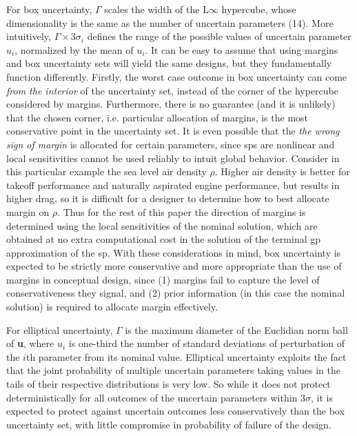 For box uncertainty,
$\Gamma$ scales the width of the L$\infty$ hypercube, whose dimensionality is the same as the number of uncertain parameters (14).
More intuitively, $\Gamma \times 3\sigma_i$ defines the range of the possible values of uncertain parameter $u_i$,
normalized by the mean of $u_i$.
It can be easy to assume that using margins and box uncertainty sets will yield the same designs,
but they fundamentally function differently.
Firstly, the worst case outcome in box uncertainty can come \emph{from the interior} of the uncertainty
set, instead of the corner of the hypercube considered
by margins. Furthermore, there is no guarantee (and it is unlikely)
that the chosen corner, i.e. particular allocation of margins,
is the most conservative point in the uncertainty set.
It is even possible that the \emph{the wrong sign of margin} is allocated for certain parameters,
since \gls{sp}s are nonlinear and local sensitivities cannot be used reliably to intuit global behavior. {\color{blue}Consider
in this particular example the sea level air density $\rho$.
Higher air density is better for takeoff performance and naturally aspirated engine performance,
but results in higher drag, so it is difficult
for a designer to determine how to best allocate margin on $\rho$.} Thus for the rest
of this paper the direction of margins is determined using the local sensitivities of the nominal solution,
which are obtained at no extra computational cost in the solution of the terminal \gls{gp} approximation of the \gls{sp}.
With these considerations in mind, box uncertainty is expected to be strictly more conservative
and more appropriate than the use of margins
in conceptual design, since (1) margins fail to capture the level of conservativeness they signal, and (2) prior
information (in this case the nominal solution) is required to allocate margin effectively.

For elliptical uncertainty, $\Gamma$ is the maximum diameter of the Euclidian norm
ball of \textbf{u}, where $u_i$ is {\color{blue}one-third} the number of standard deviations of perturbation of the
$i$th parameter from its nominal value.
Elliptical uncertainty exploits the fact that the joint probability of
multiple uncertain parameters taking values in the tails of their respective distributions is
very low. So while it does not protect deterministically for all outcomes of the uncertain
parameters within $3\sigma$, it is expected to protect against uncertain outcomes
less conservatively than the box uncertainty set, with little compromise in probability of failure
of the design.
